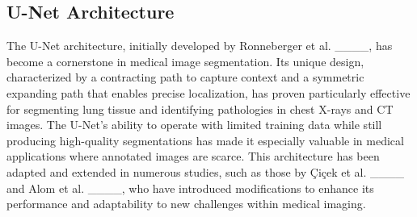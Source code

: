 \subsection{U-Net Architecture}
The U-Net architecture, initially developed by Ronneberger et al. ____, has become a cornerstone in medical image segmentation. Its unique design, characterized by a contracting path to capture context and a symmetric expanding path that enables precise localization, has proven particularly effective for segmenting lung tissue and identifying pathologies in chest X-rays and CT images. The U-Net's ability to operate with limited training data while still producing high-quality segmentations has made it especially valuable in medical applications where annotated images are scarce. This architecture has been adapted and extended in numerous studies, such as those by Çiçek et al. ____ and Alom et al. ____, who have introduced modifications to enhance its performance and adaptability to new challenges within medical imaging.